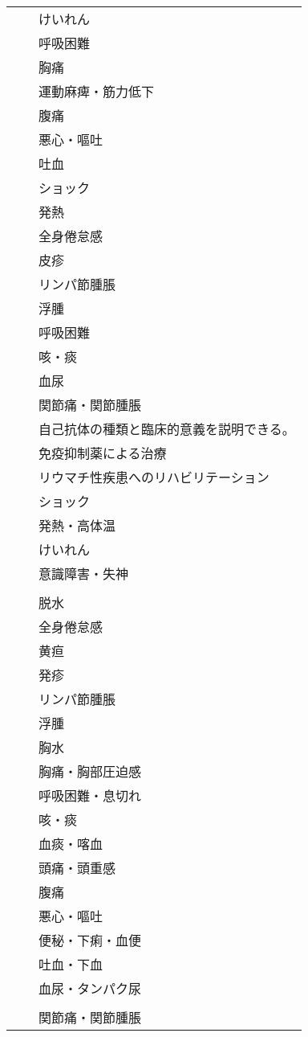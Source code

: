 \begin{xltabular}{\linewidth}{XXX}
 &  & けいれん \\
 &  & 呼吸困難 \\
 &  & 胸痛 \\
 &  & 運動麻痺・筋力低下 \\
 &  & 腹痛 \\
 &  & 悪心・嘔吐 \\
 &  & 吐血 \\
 &  & ショック \\
 &  & 発熱 \\
 &  & 全身倦怠感 \\
 &  & 皮疹 \\
 &  & リンパ節腫脹 \\
 &  & 浮腫 \\
 &  & 呼吸困難 \\
 &  & 咳・痰 \\
 &  & 血尿 \\
 &  & 関節痛・関節腫脹 \\
 &  & 自己抗体の種類と臨床的意義を説明できる。 \\
 &  & 免疫抑制薬による治療 \\
 &  & リウマチ性疾患へのリハビリテーション \\
 &  & ショック \\
 &  & 発熱・高体温 \\
 &  & けいれん \\
 &  & 意識障害・失神 \\
 &  &  \\
 &  & 脱水 \\
 &  & 全身倦怠感 \\
 &  & 黄疸 \\
 &  & 発疹 \\
 &  & リンパ節腫脹 \\
 &  & 浮腫 \\
 &  & 胸水 \\
 &  & 胸痛・胸部圧迫感 \\
 &  & 呼吸困難・息切れ \\
 &  & 咳・痰 \\
 &  & 血痰・喀血 \\
 &  & 頭痛・頭重感 \\
 &  & 腹痛 \\
 &  & 悪心・嘔吐 \\
 &  & 便秘・下痢・血便 \\
 &  & 吐血・下血 \\
 &  & 血尿・タンパク尿 \\
 &  &  \\
 &  & 関節痛・関節腫脹 \\

\end{xltabular}
